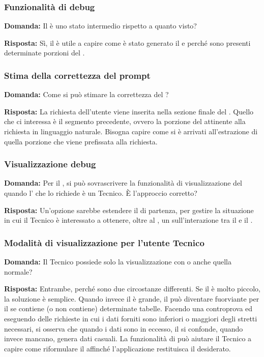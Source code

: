 \subsubsection{Funzionalità di debug}

\textbf{Domanda:} Il  è uno stato intermedio rispetto a quanto visto?

\textbf{Risposta:} Sì, il  è utile a capire come è stato generato il  e perché sono presenti determinate porzioni del .


\subsubsection{Stima della correttezza del prompt}

\textbf{Domanda:} Come si può stimare la correttezza del ?

\textbf{Risposta:} La richiesta dell'utente viene inserita nella sezione finale del . Quello che ci interessa è il segmento precedente, ovvero la porzione del  attinente alla richiesta in linguaggio naturale. Bisogna capire come si è arrivati all'estrazione di quella porzione che viene prefissata alla richiesta.

\subsubsection{Visualizzazione debug}

\textbf{Domanda:} Per il , si può sovrascrivere la funzionalità di visualizzazione del  quando l' che lo richiede è un Tecnico. È l’approccio corretto?

\textbf{Risposta:} Un’opzione sarebbe estendere il  di partenza, per gestire la situazione in cui il Tecnico è interessato a ottenere, oltre al , un  sull'interazione tra il  e il .


\subsubsection{Modalità di visualizzazione per l'utente Tecnico}

\textbf{Domanda:} Il Tecnico possiede solo la visualizzazione con  o anche quella normale?

\textbf{Risposta:} Entrambe, perché sono due circostanze differenti. Se il  è molto piccolo, la soluzione è semplice. Quando invece il  è grande, il  può diventare fuorviante per il  se contiene (o non contiene) determinate tabelle. Facendo una controprova ed eseguendo delle richieste in cui i dati forniti sono inferiori o maggiori degli stretti necessari, si osserva che quando i dati sono in eccesso, il  si confonde, quando invece mancano, genera dati casuali. La funzionalità di  può aiutare il Tecnico a capire come riformulare il  affinché l'applicazione restituisca il  desiderato.

